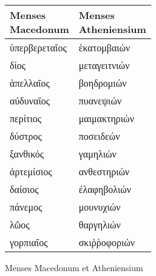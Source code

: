 %
\normalsize
\centering
\begin{tabular}{ l  l }
\toprule
\parbox[b]{6em}{Menses \\ Macedonum} &
\parbox[b]{6em}{Menses \\ Atheniensium} \\
\midrule
\textgreek{ὑπερβερεταῖος}  &\textgreek{ἑκατομβαιών} \\
\textgreek{δίος}           &\textgreek{μεταγειτνιών} \\
\textgreek{ἀπελλαῖος}      &\textgreek{βοηδρομιών} \\
%
\textgreek{αὐδυναῖος}      &\textgreek{πυανεψιών} \\
\textgreek{περίτιος}        &\textgreek{μαιμακτηριών} \\
\textgreek{δύστρος}        &\textgreek{ποσειδεών} \\
%
\textgreek{ξανθικός}       &\textgreek{γαμηλιών} \\
\textgreek{ἀρτεμίσιος}     &\textgreek{ανθεστηριών} \\
\textgreek{δαίσιος}        &\textgreek{ἐλαφηβολιών} \\
%
\textgreek{πάνεμος}        &\textgreek{μουνυχιών} \\
\textgreek{λῶος}          &\textgreek{θαργηλιών} \\
\textgreek{γορπιαῖος}      &\textgreek{σκιῤῥοφοριών} \\
\bottomrule
\end{tabular}
%
\caption{Menses Macedonum et Atheniensium}
\label{tab:p048}
